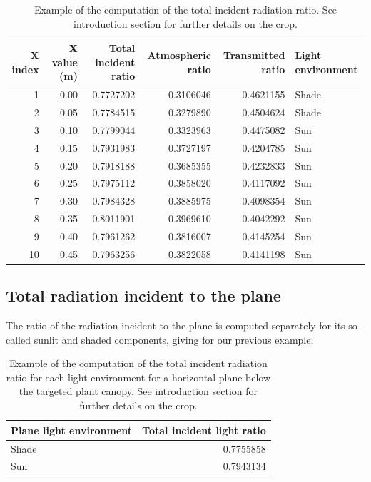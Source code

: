\documentclass[]{book}
\theoremstyle{definition}
\theoremstyle{definition}
\theoremstyle{definition}
\theoremstyle{remark}
\begin{document}
\begin{table}

\caption{\label{tab:unnamed-chunk-5}Example of the computation of the total incident radiation ratio. See introduction section for further details on the crop.}
\centering
\begin{tabular}[t]{r|r|r|r|r|l}
\hline
X index & X value (m) & Total incident ratio & Atmospheric ratio & Transmitted ratio & Light environment\\
\hline
1 & 0.00 & 0.7727202 & 0.3106046 & 0.4621155 & Shade\\
\hline
2 & 0.05 & 0.7784515 & 0.3279890 & 0.4504624 & Shade\\
\hline
3 & 0.10 & 0.7799044 & 0.3323963 & 0.4475082 & Sun\\
\hline
4 & 0.15 & 0.7931983 & 0.3727197 & 0.4204785 & Sun\\
\hline
5 & 0.20 & 0.7918188 & 0.3685355 & 0.4232833 & Sun\\
\hline
6 & 0.25 & 0.7975112 & 0.3858020 & 0.4117092 & Sun\\
\hline
7 & 0.30 & 0.7984328 & 0.3885975 & 0.4098354 & Sun\\
\hline
8 & 0.35 & 0.8011901 & 0.3969610 & 0.4042292 & Sun\\
\hline
9 & 0.40 & 0.7961262 & 0.3816007 & 0.4145254 & Sun\\
\hline
10 & 0.45 & 0.7963256 & 0.3822058 & 0.4141198 & Sun\\
\hline
\end{tabular}
\end{table}

\subsection{Total radiation incident to the
plane}\label{total-radiation-incident-to-the-plane}

The ratio of the radiation incident to the plane is computed separately
for its so-called sunlit and shaded components, giving for our previous
example:

\begin{table}

\caption{\label{tab:unnamed-chunk-6}Example of the computation of the total incident radiation ratio for each light environment for a horizontal plane below the targeted plant canopy. See introduction section for further details on the crop.}
\centering
\begin{tabular}[t]{l|r}
\hline
Plane light environment & Total incident light ratio\\
\hline
Shade & 0.7755858\\
\hline
Sun & 0.7943134\\
\hline
\end{tabular}
\end{table}
\end{document}
